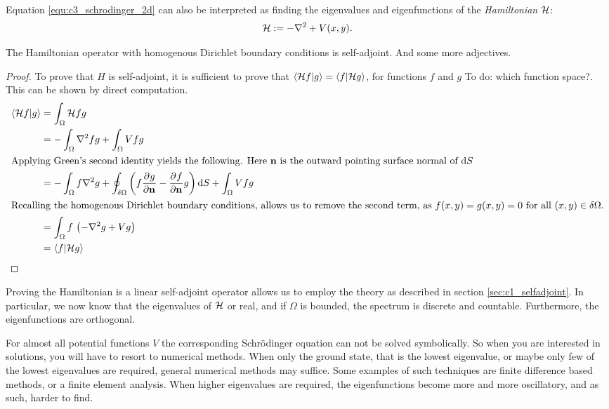 Equation \eqref{equ:c3_schrodinger_2d} can also be interpreted as finding the eigenvalues and eigenfunctions of the \emph{Hamiltonian} $\mathcal{H}$:
$$
    \mathcal{H} := -\nabla^2 + V(x, y)\text{.}
$$
\begin{theorem}
    The Hamiltonian operator with homogenous Dirichlet boundary conditions is self-adjoint. And some more adjectives.
\end{theorem}
\begin{proof}
    To prove that $H$ is self-adjoint, it is sufficient to prove that $\bra{\mathcal{H} f}\ket{g} = \bra{f}\ket{\mathcal{H} g}$, for functions $f$ and $g$ {\color{red} To do: which function space?}. This can be shown by direct computation.
    \begin{align*}
        \bra{\mathcal{H} f}\ket{g} & = \int_\Omega \mathcal{H} f g                                                                                                        \\
                                    & = -\int_\Omega \nabla^2 f g + \int_\Omega V f g                                                                                       \\
        \intertext{Applying Green's second identity yields the following. Here $\vb{n}$ is the outward pointing surface normal of $\dd S$ }
                                    & = -\int_\Omega f \nabla^2 g + \oint_{\delta\Omega} \left( f \pdv[]{g}{\vb{n}} - \pdv[]{f}{\vb{n}} g  \right)\dd S + \int_\Omega V f g \\
        \intertext{Recalling the homogenous Dirichlet boundary conditions, allows us to remove the second term, as $f(x,y) = g(x, y) = 0$ for all $(x, y) \in \delta\Omega$.}
                                    & =\int_\Omega f\,\left(-\nabla^2 g  + V g\right)                                                                                       \\
                                    & = \bra{f}\ket{\mathcal{H} g}
    \end{align*}
\end{proof}

Proving the Hamiltonian is a linear self-adjoint operator allows us to employ the theory as described in section \ref{sec:c1_selfadjoint}. In particular, we now know that the eigenvalues of $\mathcal{H}$ or real, and if $\Omega$ is bounded, the spectrum is discrete and countable. Furthermore, the eigenfunctions are orthogonal.

For almost all potential functions $V$ the corresponding Schrödinger equation can not be solved symbolically. So when you are interested in solutions, you will have to resort to numerical methods. When only the ground state, that is the lowest eigenvalue, or maybe only few of the lowest eigenvalues are required, general numerical methods may suffice. Some examples of such techniques are finite difference based methods, or a finite element analysis. When higher eigenvalues are required, the eigenfunctions become more and more oscillatory, and as such, harder to find.

